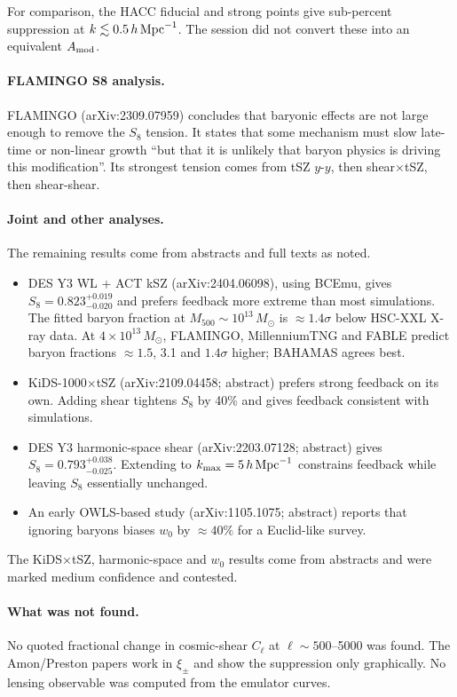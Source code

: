 \documentclass[11pt,a4paper]{article}
\begin{document}
For comparison, the HACC fiducial and strong points give sub-percent suppression at $k\lesssim0.5\,h\,{\rm Mpc}^{-1}$. The session did not convert these into an equivalent $A_{\rm mod}$.

\paragraph{FLAMINGO S8 analysis.} FLAMINGO (arXiv:2309.07959) concludes that baryonic effects are not large enough to remove the $S_8$ tension. It states that some mechanism must slow late-time or non-linear growth ``but that it is unlikely that baryon physics is driving this modification''. Its strongest tension comes from tSZ $y$-$y$, then shear$\times$tSZ, then shear-shear.

\paragraph{Joint and other analyses.} The remaining results come from abstracts and full texts as noted.
\begin{itemize}
\item DES Y3 WL + ACT kSZ (arXiv:2404.06098), using BCEmu, gives $S_8=0.823^{+0.019}_{-0.020}$ and prefers feedback more extreme than most simulations. The fitted baryon fraction at $M_{500}\sim10^{13}\,M_\odot$ is $\approx1.4\sigma$ below HSC-XXL X-ray data. At $4\times10^{13}\,M_\odot$, FLAMINGO, MillenniumTNG and FABLE predict baryon fractions $\approx1.5$, 3.1 and $1.4\sigma$ higher; BAHAMAS agrees best.
\item KiDS-1000$\times$tSZ (arXiv:2109.04458; abstract) prefers strong feedback on its own. Adding shear tightens $S_8$ by 40\% and gives feedback consistent with simulations.
\item DES Y3 harmonic-space shear (arXiv:2203.07128; abstract) gives $S_8=0.793^{+0.038}_{-0.025}$. Extending to $k_{\max}=5\,h\,{\rm Mpc}^{-1}$ constrains feedback while leaving $S_8$ essentially unchanged.
\item An early OWLS-based study (arXiv:1105.1075; abstract) reports that ignoring baryons biases $w_0$ by $\approx40\%$ for a Euclid-like survey.
\end{itemize}
The KiDS$\times$tSZ, harmonic-space and $w_0$ results come from abstracts and were marked medium confidence and contested.

\paragraph{What was not found.} No quoted fractional change in cosmic-shear $C_\ell$ at $\ell\sim500$--5000 was found. The Amon/Preston papers work in $\xi_\pm$ and show the suppression only graphically. No lensing observable was computed from the emulator curves.
\end{document}
